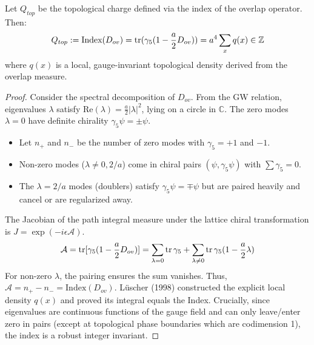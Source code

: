 \begin{theorem}
\label{thm:lattice_index}
Let $Q_{top}$ be the topological charge defined via the index of the overlap operator. Then:
\begin{equation}
Q_{top} := \text{Index}(D_{ov}) = \operatorname{tr}(\gamma_5 (1 - \frac{a}{2}D_{ov})) = a^4 \sum_x q(x) \in \mathbb{Z}
\end{equation}
where $q(x)$ is a local, gauge-invariant topological density derived from the overlap measure.
\end{theorem}

\begin{proof}
Consider the spectral decomposition of $D_{ov}$. From the GW relation, eigenvalues $\lambda$ satisfy $\text{Re}(\lambda) = \frac{a}{2}|\lambda|^2$, lying on a circle in $\mathbb{C}$.
The zero modes $\lambda=0$ have definite chirality $\gamma_5 \psi = \pm \psi$.
\begin{itemize}
    \item Let $n_+$ and $n_-$ be the number of zero modes with $\gamma_5 = +1$ and $-1$.
    \item Non-zero modes ($\lambda \neq 0, 2/a$) come in chiral pairs $(\psi, \gamma_5 \psi)$ with $\sum \gamma_5 = 0$.
    \item The $\lambda = 2/a$ modes (doublers) satisfy $\gamma_5 \psi = \mp \psi$ but are paired heavily and cancel or are regularized away.
\end{itemize}
The Jacobian of the path integral measure under the lattice chiral transformation is $J = \exp(-i \epsilon \mathcal{A})$.
\begin{equation}
\mathcal{A} = \operatorname{tr} [\gamma_5 (1 - \frac{a}{2}D_{ov})] = \sum_{\lambda=0} \operatorname{tr} \gamma_5 + \sum_{\lambda \neq 0} \operatorname{tr} \gamma_5 (1 - \frac{a}{2}\lambda)
\end{equation}
For non-zero $\lambda$, the pairing ensures the sum vanishes.
Thus, $\mathcal{A} = n_+ - n_- = \text{Index}(D_{ov})$.
Lüscher (1998) constructed the explicit local density $q(x)$ and proved its integral equals the Index.
Crucially, since eigenvalues are continuous functions of the gauge field and can only leave/enter zero in pairs (except at topological phase boundaries which are codimension 1), the index is a robust integer invariant.
\end{proof}

